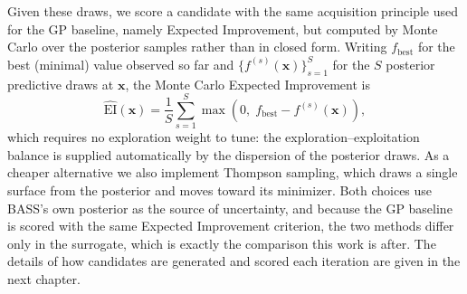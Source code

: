Given these draws, we score a candidate with the same acquisition principle used for the GP baseline, namely Expected Improvement, but computed by Monte Carlo over the posterior samples rather than in closed form. Writing $f_{\text{best}}$ for the best (minimal) value observed so far and $\{f^{(s)}(\boldsymbol{x})\}_{s=1}^{S}$ for the $S$ posterior predictive draws at $\boldsymbol{x}$, the Monte Carlo Expected Improvement is
\[ \widehat{\mathrm{EI}}(\boldsymbol{x}) = \frac{1}{S}\sum_{s=1}^{S} \max\!\left(0,\; f_{\text{best}} - f^{(s)}(\boldsymbol{x})\right), \]
which requires no exploration weight to tune: the exploration--exploitation balance is supplied automatically by the dispersion of the posterior draws. As a cheaper alternative we also implement Thompson sampling, which draws a single surface from the posterior and moves toward its minimizer. Both choices use BASS's own posterior as the source of uncertainty, and because the GP baseline is scored with the same Expected Improvement criterion, the two methods differ only in the surrogate, which is exactly the comparison this work is after. The details of how candidates are generated and scored each iteration are given in the next chapter.
